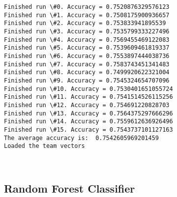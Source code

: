 \documentclass[11pt]{article}
\begin{document}
    \begin{Verbatim}[commandchars=\\\{\}]
Finished run \#0. Accuracy = 0.7520876329576123
Finished run \#1. Accuracy = 0.7508175900936657
Finished run \#2. Accuracy = 0.753833941895539
Finished run \#3. Accuracy = 0.7535799333227496
Finished run \#4. Accuracy = 0.7569455469122083
Finished run \#5. Accuracy = 0.7539609461819337
Finished run \#6. Accuracy = 0.7553897444038736
Finished run \#7. Accuracy = 0.7583743451341483
Finished run \#8. Accuracy = 0.7499920622321004
Finished run \#9. Accuracy = 0.7545324654707096
Finished run \#10. Accuracy = 0.7530401651055724
Finished run \#11. Accuracy = 0.7541514526115256
Finished run \#12. Accuracy = 0.754691220828703
Finished run \#13. Accuracy = 0.7564375297666296
Finished run \#14. Accuracy = 0.7559612636926496
Finished run \#15. Accuracy = 0.7543737101127163
The average accuracy is:  0.7542605969201459
Loaded the team vectors

    \end{Verbatim}

    \begin{center}
    \end{center}
    { \hspace*{\fill} \\}
    
    \hypertarget{random-forest-classifier}{%
\subsection{Random Forest Classifier}\label{random-forest-classifier}}
\end{document}
